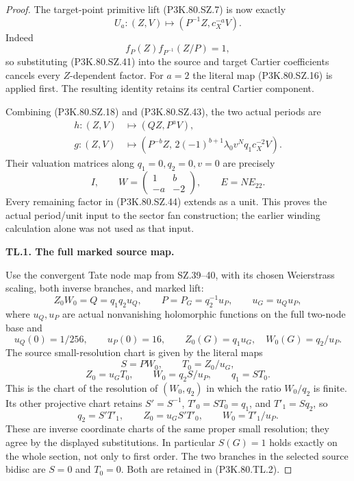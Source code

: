 \begin{proof}
The target-point primitive lift (P3K.80.SZ.7) is now exactly
\[
 U_a:(Z,V)\longmapsto(P^{-1}Z,c_X^{-a}V).             \tag{P3K.80.SZ.43}
\]
Indeed
\[
 f_P(Z)f_{P^{-1}}(Z/P)=1,
\]
so substituting (P3K.80.SZ.41) into the source and target Cartier
coefficients cancels every \(Z\)-dependent factor. For \(a=2\)
the literal map (P3K.80.SZ.16) is applied first. The resulting identity
retains its central Cartier component.

Combining (P3K.80.SZ.18) and (P3K.80.SZ.43), the two actual periods are
\[
 \begin{split}
 h:(Z,V)&\longmapsto
       (QZ,P^aV),\\
 g:(Z,V)&\longmapsto
       (P^{-b}Z,\,
        2(-1)^{b+1}\lambda_0v^Nq_1c_X^{-2}V).
 \end{split}                                                   \tag{P3K.80.SZ.44}
\]
Their valuation matrices along \(q_1=0,q_2=0,v=0\) are precisely
\[
 I,\qquad W=\begin{pmatrix}1&b\\-a&-2\end{pmatrix},
 \qquad E=NE_{22}.
\]
Every remaining factor in (P3K.80.SZ.44) extends as a unit. This proves
the actual period/unit input to the sector fan construction; the
earlier winding calculation alone was not used as that input.

\par\medskip\noindent\textbf{TL.1. The full marked source map.}\par\nopagebreak[4]

Use the convergent Tate node map from SZ.39--40, with its chosen
Weierstrass scaling, both inverse branches, and marked lift:
\[
 Z_0W_0=Q=q_1q_2u_Q,\qquad
 P=P_G=q_2^{-1}u_P,\qquad u_G=u_Qu_P,
\tag{P3K.80.TL.1}
\]
where \(u_Q,u_P\) are actual nonvanishing holomorphic functions on
the full two-node base and
\[
 u_Q(0)=1/256,\qquad u_P(0)=16,
\qquad Z_0(G)=q_1u_G,\quad W_0(G)=q_2/u_P.
\]
The source small-resolution chart is given by the literal maps
\[
 S=P W_0,\qquad T_0=Z_0/u_G,
\]
\[
 Z_0=u_GT_0,\qquad W_0=q_2S/u_P,
\qquad q_1=ST_0.                                    \tag{P3K.80.TL.2}
\]
This is the chart of the resolution of \((W_0,q_2)\) in which the
ratio \(W_0/q_2\) is finite. Its other projective chart retains
\(S'=S^{-1}\), \(T'_0=ST_0=q_1\), and \(T'_1=S q_2\), so
\[
 q_2=S'T'_1,\qquad
 Z_0=u_G S'T'_0,\qquad W_0=T'_1/u_P.
\tag{P3K.80.TL.3}
\]
These are inverse coordinate charts of the same proper small
resolution; they agree by the displayed substitutions. In particular
\(S(G)=1\) holds exactly on the whole section, not only to first
order. The two branches in the selected source bidisc are
\(S=0\) and \(T_0=0\). Both are retained in (P3K.80.TL.2).


\end{proof}
